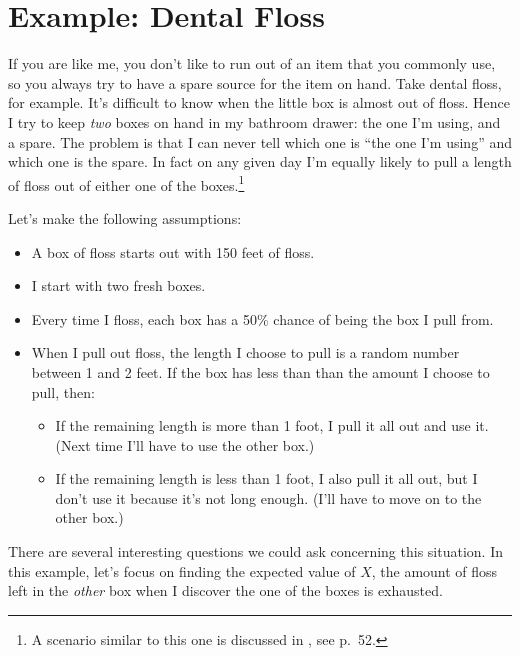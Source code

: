 \documentclass[]{book}
\providecommand{\tightlist}{%
  \setlength{\itemsep}{0pt}\setlength{\parskip}{0pt}}
\let\rmarkdownfootnote\footnote%
\def\footnote{\protect\rmarkdownfootnote}
\theoremstyle{definition}
\theoremstyle{definition}
\theoremstyle{definition}
\theoremstyle{remark}
\begin{document}
{\section{Example: Dental Floss}\label{example-dental-floss}

If you are like me, you don't like to run out of an item that you
commonly use, so you always try to have a spare source for the item on
hand. Take dental floss, for example. It's difficult to know when the
little box is almost out of floss. Hence I try to keep \emph{two} boxes
on hand in my bathroom drawer: the one I'm using, and a spare. The
problem is that I can never tell which one is ``the one I'm using'' and
which one is the spare. In fact on any given day I'm equally likely to
pull a length of floss out of either one of the boxes.\footnote{A
  scenario similar to this one is discussed in \citep{Nahin2008}, see
  p.~52.}

Let's make the following assumptions:

\begin{itemize}
\tightlist
\item
  A box of floss starts out with 150 feet of floss.
\item
  I start with two fresh boxes.
\item
  Every time I floss, each box has a 50\% chance of being the box I pull
  from.
\item
  When I pull out floss, the length I choose to pull is a random number
  between 1 and 2 feet. If the box has less than than the amount I
  choose to pull, then:

  \begin{itemize}
  \tightlist
  \item
    If the remaining length is more than 1 foot, I pull it all out and
    use it. (Next time I'll have to use the other box.)
  \item
    If the remaining length is less than 1 foot, I also pull it all out,
    but I don't use it because it's not long enough. (I'll have to move
    on to the other box.)
  \end{itemize}
\end{itemize}

There are several interesting questions we could ask concerning this
situation. In this example, let's focus on finding the expected value of
\(X\), the amount of floss left in the \emph{other} box when I discover
the one of the boxes is exhausted.

}
\end{document}
